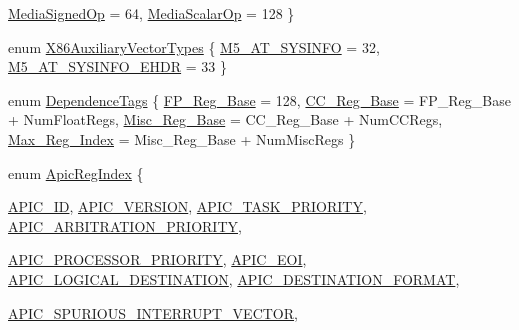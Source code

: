\begin{DoxyCompactItemize}
\hyperlink{namespaceX86ISA_a8983ba7d9e44eff3c164c601a45806b7a19421dd7b33eaa5ff6cacc798b11538b}{MediaSignedOp} =  64, 
\hyperlink{namespaceX86ISA_a8983ba7d9e44eff3c164c601a45806b7ac4f7a3c2b0fb1ed211c8c31b5a56900e}{MediaScalarOp} =  128
 \}
\item 
enum \hyperlink{namespaceX86ISA_a220a5701eb61c9715f2a66aa880d30b9}{X86AuxiliaryVectorTypes} \{ \hyperlink{namespaceX86ISA_a220a5701eb61c9715f2a66aa880d30b9a39296c9be5af2ec4edc9830fa3da5ee4}{M5\_\-AT\_\-SYSINFO} =  32, 
\hyperlink{namespaceX86ISA_a220a5701eb61c9715f2a66aa880d30b9abd0818adabbd02d06de1065979ec4691}{M5\_\-AT\_\-SYSINFO\_\-EHDR} =  33
 \}
\item 
enum \hyperlink{namespaceX86ISA_a4720195f4575f008ac78181d27db827e}{DependenceTags} \{ \hyperlink{namespaceX86ISA_a4720195f4575f008ac78181d27db827ea23c089ac23981fe820094e2fc1579bf4}{FP\_\-Reg\_\-Base} =  128, 
\hyperlink{namespaceX86ISA_a4720195f4575f008ac78181d27db827eae261857dbef59e0d93992a1e2d1fa322}{CC\_\-Reg\_\-Base} =  FP\_\-Reg\_\-Base + NumFloatRegs, 
\hyperlink{namespaceX86ISA_a4720195f4575f008ac78181d27db827ea0cbf9912f8507e55495a158f1b94f803}{Misc\_\-Reg\_\-Base} =  CC\_\-Reg\_\-Base + NumCCRegs, 
\hyperlink{namespaceX86ISA_a4720195f4575f008ac78181d27db827ea0693397933007a82bea39457bd7a7151}{Max\_\-Reg\_\-Index} =  Misc\_\-Reg\_\-Base + NumMiscRegs
 \}
\item 
enum \hyperlink{namespaceX86ISA_aaa839fcdf6f426c03c7382fcc29ac649}{ApicRegIndex} \{ \par
\hyperlink{namespaceX86ISA_aaa839fcdf6f426c03c7382fcc29ac649acd891a613799d8d7d83e1be86cbf496d}{APIC\_\-ID}, 
\hyperlink{namespaceX86ISA_aaa839fcdf6f426c03c7382fcc29ac649a60b0a6b6dab97b269e1fc9cccd33d7c6}{APIC\_\-VERSION}, 
\hyperlink{namespaceX86ISA_aaa839fcdf6f426c03c7382fcc29ac649afd5e32c09545fe1754c5d78fbe029b85}{APIC\_\-TASK\_\-PRIORITY}, 
\hyperlink{namespaceX86ISA_aaa839fcdf6f426c03c7382fcc29ac649a1503828ef17c9b88de44b778f6efd52c}{APIC\_\-ARBITRATION\_\-PRIORITY}, 
\par
\hyperlink{namespaceX86ISA_aaa839fcdf6f426c03c7382fcc29ac649a15292e2ed7b167af9a19a4db2406077b}{APIC\_\-PROCESSOR\_\-PRIORITY}, 
\hyperlink{namespaceX86ISA_aaa839fcdf6f426c03c7382fcc29ac649abdb2804479ba12b1366696688da795e7}{APIC\_\-EOI}, 
\hyperlink{namespaceX86ISA_aaa839fcdf6f426c03c7382fcc29ac649a137774031793b99cde054b3dccb12bdd}{APIC\_\-LOGICAL\_\-DESTINATION}, 
\hyperlink{namespaceX86ISA_aaa839fcdf6f426c03c7382fcc29ac649a77cc386e5345ab6ec3c09dd960973dd6}{APIC\_\-DESTINATION\_\-FORMAT}, 
\par
\hyperlink{namespaceX86ISA_aaa839fcdf6f426c03c7382fcc29ac649ad2fbb7c848d92024ea8c72740bc5a5b0}{APIC\_\-SPURIOUS\_\-INTERRUPT\_\-VECTOR}, 

\end{DoxyCompactItemize}
